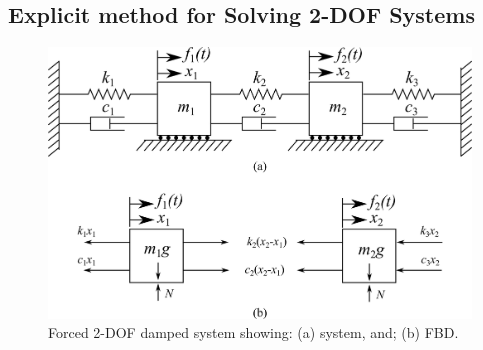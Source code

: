 \documentclass[12pt,letter]{article}
\begin{document}
	
	
	\subsection{Explicit method for Solving 2-DOF Systems}
	
	
	\begin{figure}[H]
		\centering
		\includegraphics[]{../figures/2-DOF-spring_mass_dashpot_horizontal_forced_double_wall.png}
		\caption{Forced 2-DOF damped system showing: (a) system, and; (b) FBD.}
		\label{fig:2-DOF-spring_mass_dashpot_horizontal_double_wall}
	\end{figure}
	
\end{document}
